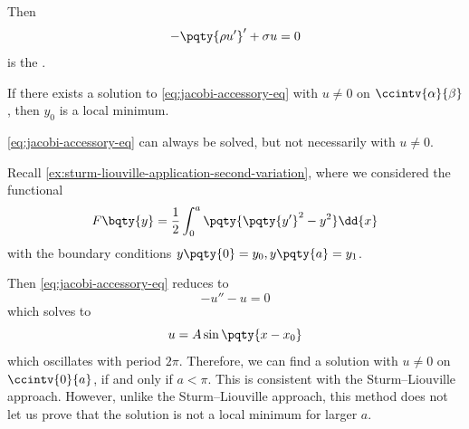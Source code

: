 Then
\begin{equation}
    \label{eq:jacobi-accessory-eq}%
    - \pqty{\rho u'}' + \sigma u = 0
\end{equation}
is the .

\begin{theorem}
    If there exists a solution to \eqref{eq:jacobi-accessory-eq} with \(u \neq 0\) on \(\ccintv{\alpha}{\beta}\), then \(y_0\) is a local minimum.
\end{theorem}

\begin{remark}
    \eqref{eq:jacobi-accessory-eq} can always be solved, but not necessarily with \(u \neq 0\).
\end{remark}

\begin{example}
    Recall \autoref{ex:sturm-liouville-application-second-variation}, where we considered the functional
    \[
        F\bqty{y} = \frac{1}{2} \int_{0}^{a} \pqty{\pqty{y'}^2 - y^2} \dd{x}
    \]
    with the boundary conditions \(y\pqty{0} = y_0, y\pqty{a} = y_1\).
    
    Then \eqref{eq:jacobi-accessory-eq} reduces to
    \[
        - u'' - u = 0
    \]
    which solves to
    \[
        u = A \sin \pqty{x - x_0}
    \]
    which oscillates with period \(2 \pi\). Therefore, we can find a solution with \(u \neq 0\) on \(\ccintv{0}{a}\), if and only if \(a < \pi\). This is consistent with the Sturm--Liouville approach. However, unlike the Sturm--Liouville approach, this method does not let us prove that the solution is not a local minimum for larger \(a\).
\end{example}